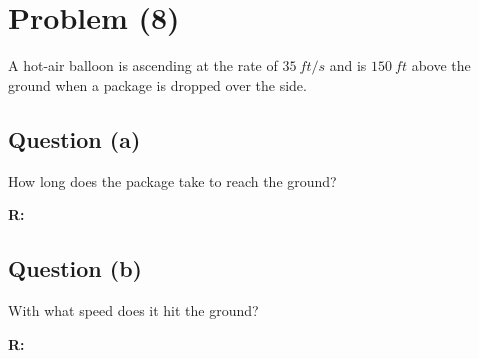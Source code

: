 \section{Problem (8)}
	A hot-air balloon is ascending at the rate of $35 \ ft/s$ and is $150 \ ft$ above the ground when a package is dropped over the side.

	\subsection{Question (a)}
		How long does the package take to reach the ground?

		\textbf{R:} \newline

	\subsection{Question (b)}
		With what speed does it hit the ground?

		\textbf{R:} \newline
